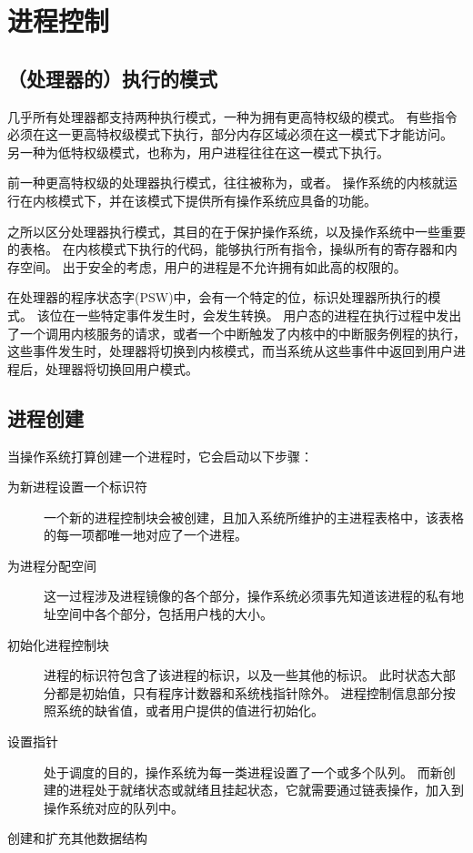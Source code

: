 
\section{进程控制}
{
    \subsection{（处理器的）执行的模式}
    {
        几乎所有处理器都支持两种执行模式，一种为拥有更高特权级的模式。
        有些指令必须在这一更高特权级模式下执行，部分内存区域必须在这一模式下才能访问。
        另一种为低特权级模式，也称为，用户进程往往在这一模式下执行。

        前一种更高特权级的处理器执行模式，往往被称为，或者。
        操作系统的内核就运行在内核模式下，并在该模式下提供所有操作系统应具备的功能。

        之所以区分处理器执行模式，其目的在于保护操作系统，以及操作系统中一些重要的表格。
        在内核模式下执行的代码，能够执行所有指令，操纵所有的寄存器和内存空间。
        出于安全的考虑，用户的进程是不允许拥有如此高的权限的。

        在处理器的程序状态字(PSW)中，会有一个特定的位，标识处理器所执行的模式。
        该位在一些特定事件发生时，会发生转换。
        用户态的进程在执行过程中发出了一个调用内核服务的请求，或者一个中断触发了内核中的中断服务例程的执行，这些事件发生时，处理器将切换到内核模式，而当系统从这些事件中返回到用户进程后，处理器将切换回用户模式。
    }

    \subsection{进程创建}
    {
        当操作系统打算创建一个进程时，它会启动以下步骤：

        \begin{description}
            \item[为新进程设置一个标识符] 一个新的进程控制块会被创建，且加入系统所维护的主进程表格中，该表格的每一项都唯一地对应了一个进程。
            \item[为进程分配空间] 这一过程涉及进程镜像的各个部分，操作系统必须事先知道该进程的私有地址空间中各个部分，包括用户栈的大小。
            \item[初始化进程控制块]
            {
                进程的标识符包含了该进程的标识，以及一些其他的标识。
                此时状态大部分都是初始值，只有程序计数器和系统栈指针除外。
                进程控制信息部分按照系统的缺省值，或者用户提供的值进行初始化。
            }
            \item[设置指针]
            {
                处于调度的目的，操作系统为每一类进程设置了一个或多个队列。
                而新创建的进程处于就绪状态或就绪且挂起状态，它就需要通过链表操作，加入到操作系统对应的队列中。
            }
            \item[创建和扩充其他数据结构]
        \end{description}
    }

}
